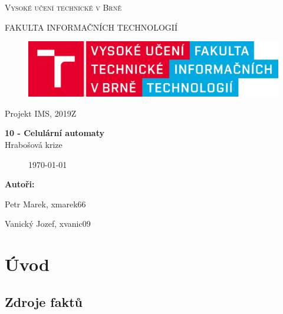 \documentclass[a4paper,11pt]{article}
\begin{document}

\begin{titlepage}
\begin{center}
    {\Huge \textsc{Vysoké učení technické v Brně}}
    
    {\LARGE \uppercase{FAKULTA INFORMAČNÍCH TECHNOLOGIÍ}}
    
\begin{figure}[h]
\vspace{5.0cm}
\centering
\includegraphics[scale=0.15]{logo.png}
\vspace{-10.0cm}
\end{figure}
    
	{\LARGE Projekt IMS, 2019Z}

	{\Huge \textbf{10 - Celulární automaty}}
\\

{\LARGE {Hrabošová krize}}\\

\begin{figure}[h]
\centering
{\Large {\mydate\today}}
\vspace{6cm}
\end{figure}

\end{center}
\begin{compactitem}
\item[] \textbf{Autoři:}
\item[] Petr Marek, xmarek66
\item[] Vanický Jozef, xvanic09
\end{compactitem}

\end{titlepage}

\tableofcontents
\newpage

\section{Úvod}
\subsection{Zdroje faktů}
\end{document}
